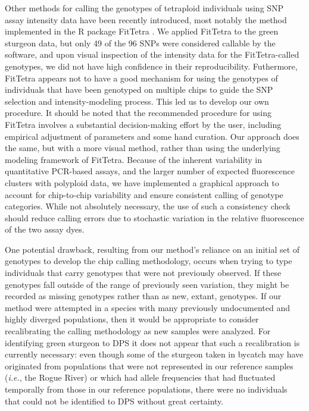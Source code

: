\documentclass[twocolumn,natbib]{svjour3}       %
\newcommand{\ie}{{\em i.e.},\xspace }
\begin{document}
Other methods for calling the genotypes 
of tetraploid individuals using SNP assay intensity data have been recently
introduced, most notably the method implemented in the R package {\sc FitTetra} 
\citep{voorrips2011genotype}.   We applied {\sc FitTetra} to the green sturgeon data, 
but only 49 of the 96
SNPs were considered callable by the software, and upon visual inspection of the
intensity data for the {\sc FitTetra}-called genotypes, we did not have high confidence in their reproducibility. 
Futhermore, {\sc FitTetra} appears not to have a good 
mechanism for using the genotypes of individuals that have been genotyped on multiple chips to guide
the SNP selection and intensity-modeling process.  This led us to develop
our own procedure.  
It should be noted that the recommended procedure for using {\sc FitTetra} involves a 
substantial decision-making effort by the user, including empirical 
adjustment of parameters and some hand curation. Our approach does the same, but with a more visual
method, rather than using the underlying modeling framework of {\sc FitTetra}.
Because of the inherent variability in quantitative PCR-based assays, and the larger number of expected fluorescence clusters with polyploid data, we have implemented a graphical approach to account for chip-to-chip variability and ensure consistent calling of genotype categories. While not absolutely necessary, the use of such a consistency check should reduce calling errors due to stochastic variation in the relative fluorescence of the two assay dyes.

One potential drawback, resulting from our method's reliance on an initial set
of genotypes to develop the chip calling methodology, occurs when
trying to type individuals that
carry genotypes that were not previously observed.  If these genotypes fall
outside of the range of previously seen variation, they might be recorded as missing
genotypes rather than as new, extant, genotypes.  If our method were attempted 
in a species with many previously undocumented and highly diverged populations, then it would
be appropriate to consider recalibrating the calling methodology as new samples were analyzed.
For identifying green sturgeon to DPS it does not appear that such a recalibration
is currently necessary: even though some of the sturgeon
taken in bycatch may have originated from populations that were not represented in our reference
samples (\ie the Rogue River) or which had allele frequencies that
had fluctuated temporally from those in our reference populations, there were no individuals that could not be identified to DPS without great certainty.
\end{document}

